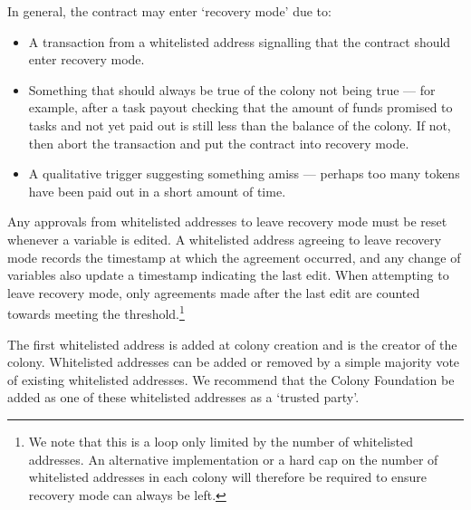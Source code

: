 In general, the contract may enter `recovery mode' due to:
\begin{itemize}
 \item A transaction from a whitelisted address signalling that the contract should enter recovery mode.
 \item Something that should always be true of the colony not being true --- for example, after a task payout checking that the amount of funds promised to tasks and not yet paid out is still less than the balance of the colony. If not, then abort the transaction and put the contract into recovery mode.
 \item A qualitative trigger suggesting something amiss --- perhaps too many tokens have been paid out in a short amount of time.
\end{itemize}

Any approvals from whitelisted addresses to leave recovery mode must be reset whenever a variable is edited. A whitelisted address agreeing to leave recovery mode records the timestamp at which the agreement occurred, and any change of variables also update a timestamp indicating the last edit. When attempting to leave recovery mode, only agreements made after the last edit are counted towards meeting the threshold.\footnote{We note that this is a loop only limited by the number of whitelisted addresses. An alternative implementation or a hard cap on the number of whitelisted addresses in each colony will therefore be required to ensure recovery mode can always be left.}

The first whitelisted address is added at colony creation and is the creator of the colony. Whitelisted addresses can be added or removed by a simple majority vote of existing whitelisted addresses. We recommend that the Colony Foundation be added as one of these whitelisted addresses as a `trusted party'.